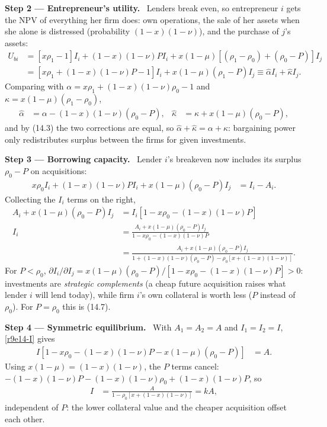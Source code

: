 \documentclass[11pt,a4paper]{article}
\newcommand{\step}[2]{\par\medskip\noindent\textbf{Step #1 --- #2.}~}
\begin{document}
\step{2}{Entrepreneur's utility} Lenders break even, so entrepreneur $i$ gets the NPV of everything her
firm does: own operations, the sale of her assets when she alone is distressed (probability $(1-x)(1-\nu)$),
and the purchase of $j$'s assets:
\begin{align}
  U_{bi} &= [x\rho_1-1]I_i+(1-x)(1-\nu)PI_i+x(1-\mu)[(\rho_1-\rho_0)+(\rho_0-P)]I_j \nonumber\\
         &= [x\rho_1+(1-x)(1-\nu)P-1]I_i+x(1-\mu)(\rho_1-P)I_j \equiv \hat\alpha I_i+\hat\kappa I_j. \label{r9e14-U}
\end{align}
Comparing with $\alpha=x\rho_1+(1-x)(1-\nu)\rho_0-1$ and $\kappa=x(1-\mu)(\rho_1-\rho_0)$,
\begin{align}
  \hat\alpha &= \alpha-(1-x)(1-\nu)(\rho_0-P), &
  \hat\kappa &= \kappa+x(1-\mu)(\rho_0-P), \label{r9e14-ak}
\end{align}
and by (14.3) the two corrections are equal, so $\hat\alpha+\hat\kappa=\alpha+\kappa$: bargaining power
only redistributes surplus between the firms for given investments.

\step{3}{Borrowing capacity} Lender $i$'s breakeven now includes its surplus $\rho_0-P$ on acquisitions:
\begin{align}
  x\rho_0I_i+(1-x)(1-\nu)PI_i+x(1-\mu)(\rho_0-P)I_j &= I_i-A_i. \label{r9e14-be}
\end{align}
Collecting the $I_i$ terms on the right,
\begin{align}
  A_i+x(1-\mu)(\rho_0-P)I_j &= I_i[1-x\rho_0-(1-x)(1-\nu)P] \nonumber\\
  I_i &= \frac{A_i+x(1-\mu)(\rho_0-P)I_j}{1-x\rho_0-(1-x)(1-\nu)P} \label{r9e14-I}\\
      &= \frac{A_i+x(1-\mu)(\rho_0-P)I_j}{1+(1-x)(1-\nu)(\rho_0-P)-\rho_0[x+(1-x)(1-\nu)]}. \nonumber
\end{align}
For $P<\rho_0$, $\partial I_i/\partial I_j=x(1-\mu)(\rho_0-P)/[1-x\rho_0-(1-x)(1-\nu)P]>0$: investments are
\emph{strategic complements} (a cheap future acquisition raises what lender $i$ will lend today), while
firm $i$'s own collateral is worth less ($P$ instead of $\rho_0$). For $P=\rho_0$ this is (14.7).

\step{4}{Symmetric equilibrium} With $A_1=A_2=A$ and $I_1=I_2=I$, \eqref{r9e14-I} gives
\begin{align}
  I[1-x\rho_0-(1-x)(1-\nu)P-x(1-\mu)(\rho_0-P)] &= A. \nonumber
\end{align}
Using $x(1-\mu)=(1-x)(1-\nu)$, the $P$ terms cancel: $-(1-x)(1-\nu)P-(1-x)(1-\nu)\rho_0+(1-x)(1-\nu)P$, so
\begin{align}
  I &= \frac{A}{1-\rho_0[x+(1-x)(1-\nu)]} = kA, \label{r9e14-sym}
\end{align}
independent of $P$: the lower collateral value and the cheaper acquisition offset each other.
\end{document}

